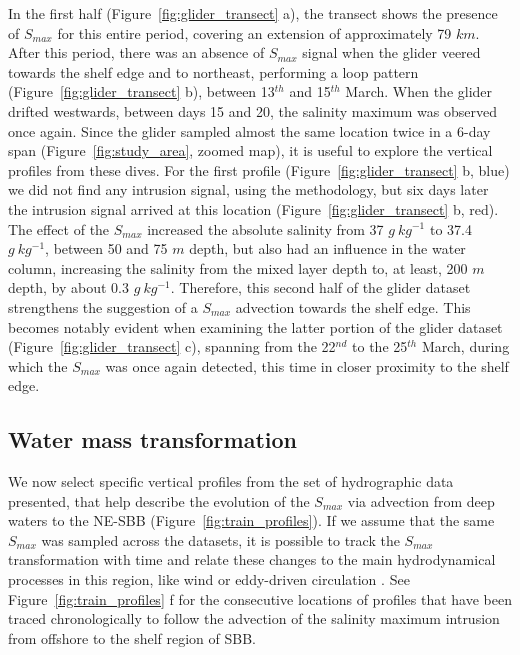 \documentclass[draft]{agujournal2019}
\begin{document}
In the first half (Figure~\ref{fig:glider_transect} a), the transect shows the presence of \textit{$S_{max}$} for this entire period, covering an extension of approximately 79 $km$. After this period, there was an absence of \textit{$S_{max}$} signal when the glider veered towards the shelf edge and to northeast, performing a loop pattern (Figure~\ref{fig:glider_transect} b), between 13$^{th}$ and 15$^{th}$ March. When the glider drifted westwards, between days 15 and 20, the salinity maximum was observed once again. Since the glider sampled almost the same location twice in a 6-day span (Figure~\ref{fig:study_area}, zoomed map), it is useful to explore the vertical profiles from these dives. For the first profile (Figure~\ref{fig:glider_transect} b, blue) we did not find any intrusion signal, using the \cite{silva2023inventory} methodology, but six days later the intrusion signal arrived at this location (Figure~\ref{fig:glider_transect} b, red). The effect of the \textit{$S_{max}$} increased the absolute salinity from 37 $g\ kg^{-1}$ to 37.4 $g\ kg^{-1}$, between 50 and 75 $m$ depth, but also had an influence in the water column, increasing the salinity from the mixed layer depth to, at least, 200 $m$ depth, by about 0.3 $g\ kg^{-1}$. Therefore, this second half of the glider dataset strengthens the suggestion of a \textit{$S_{max}$} advection towards the shelf edge. This becomes notably evident when examining the latter portion of the glider dataset (Figure~\ref{fig:glider_transect} c), spanning from the 22$^{nd}$ to the 25$^{th}$ March, during which the \textit{$S_{max}$} was once again detected, this time in closer proximity to the shelf edge.

\subsection{Water mass transformation}
\label{subsec:watermass}

We now select specific vertical profiles from the set of hydrographic data presented, that help describe the evolution of the \textit{$S_{max}$} via advection from deep waters to the NE-SBB (Figure~\ref{fig:train_profiles}). If we assume that the same \textit{$S_{max}$} was sampled across the datasets, it is possible to track the \textit{$S_{max}$} transformation with time and relate these changes to the main hydrodynamical processes in this region, like wind or eddy-driven circulation \cite{calado2010,uchoa2023,rocha2022,silveira2023}. See Figure~\ref{fig:train_profiles} f for the consecutive locations of profiles that have been traced chronologically to follow the advection of the salinity maximum intrusion from offshore to the shelf region of SBB.
\end{document}
